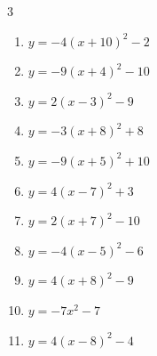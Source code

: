 \begin{multicols}{3}
\begin{enumerate}
        \phantom{$\displaystyle 頂点\left( -10 , -4 \right)$}

  \item $\displaystyle y=-4\left( x+10\right)^{2}-2$

        \phantom{$\displaystyle 頂点\left( -10 , -2 \right)$}

  \item $\displaystyle y=-9\left( x+4\right)^{2}-10$

        \phantom{$\displaystyle 頂点\left( -4 , -10 \right)$}

  \item $\displaystyle y=2\left( x-3\right)^{2}-9$

        \phantom{$\displaystyle 頂点\left( 3 , -9 \right)$}

  \item $\displaystyle y=-3\left( x+8\right)^{2}+8$

        \phantom{$\displaystyle 頂点\left( -8 , 8 \right)$}

  \item $\displaystyle y=-9\left( x+5\right)^{2}+10$

        \phantom{$\displaystyle 頂点\left( -5 , 10 \right)$}

  \item $\displaystyle y=4\left( x-7\right)^{2}+3$

        \phantom{$\displaystyle 頂点\left( 7 , 3 \right)$}

  \item $\displaystyle y=2\left( x+7\right)^{2}-10$

        \phantom{$\displaystyle 頂点\left( -7 , -10 \right)$}

  \item $\displaystyle y=-4\left( x-5\right)^{2}-6$

        \phantom{$\displaystyle 頂点\left( 5 , -6 \right)$}

  \item $\displaystyle y=4\left( x+8\right)^{2}-9$

        \phantom{$\displaystyle 頂点\left( -8 , -9 \right)$}

  \item $\displaystyle y=-7x^{2}-7$

        \phantom{$\displaystyle 頂点\left( 0 , -7 \right)$}

\columnbreak %

  \item $\displaystyle y=4\left( x-8\right)^{2}-4$


\end{enumerate}
\end{multicols}
